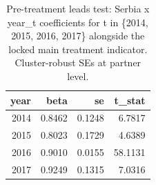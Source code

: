 \begin{table}
\caption{Pre-treatment leads test: Serbia x year\_t coefficients for t in \{2014, 2015, 2016, 2017\} alongside the locked main treatment indicator. Cluster-robust SEs at partner level.}
\label{tbl:ch5-leads-test}
\begin{tabular}{rrrr}
\toprule
year & beta & se & t\_stat \\
\midrule
2014 & 0.8462 & 0.1248 & 6.7817 \\
2015 & 0.8023 & 0.1729 & 4.6389 \\
2016 & 0.9010 & 0.0155 & 58.1131 \\
2017 & 0.9249 & 0.1315 & 7.0316 \\
\bottomrule
\end{tabular}
\end{table}
